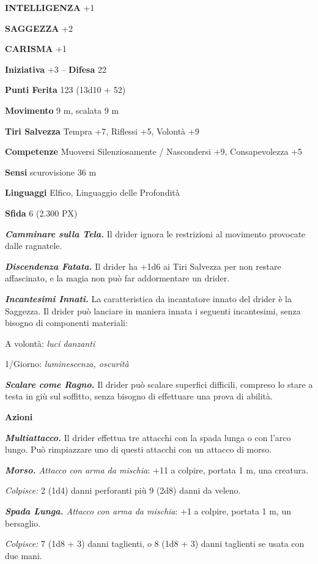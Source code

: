 \begin{multicols}{2}
\textbf{INTELLIGENZA} +1

\textbf{SAGGEZZA} +2

\textbf{CARISMA} +1

\textbf{Iniziativa} +3 -- \textbf{Difesa} 22

\textbf{Punti Ferita} 123 (13d10 + 52)

\textbf{Movimento} 9 m, scalata 9 m

\textbf{Tiri Salvezza} Tempra +7, Riflessi +5, Volontà +9

\textbf{Competenze} Muoversi Silenziosamente / Nascondersi +9, Consapevolezza +5

\textbf{Sensi} scurovisione 36 m

\textbf{Linguaggi} Elfico, Linguaggio delle Profondità

\textbf{Sfida} 6 (2.300 PX)

\textit{\textbf{Camminare sulla Tela.}} Il drider ignora le restrizioni al movimento provocate dalle ragnatele.

\textit{\textbf{Discendenza Fatata.}} Il drider ha +1d6 ai Tiri Salvezza per non restare affascinato, e la magia non può far addormentare un drider.

\textit{\textbf{Incantesimi Innati.}} La caratteristica da incantatore innato del drider è la Saggezza. Il drider può lanciare in maniera innata i seguenti incantesimi, senza bisogno di componenti materiali:

A volontà: \textit{luci danzanti}

1/Giorno: \textit{luminescenza, oscurità}

\textit{\textbf{Scalare come Ragno.}} Il drider può scalare superfici difficili, compreso lo stare a testa in giù sul soffitto, senza bisogno di effettuare una prova di abilità.

\textbf{Azioni}

\textit{\textbf{Multiattacco.}} Il drider effettua tre attacchi con la spada lunga o con l'arco lungo. Può rimpiazzare uno di questi attacchi con un attacco di morso.



\textit{\textbf{Morso.} Attacco con arma da mischia}: +11 a colpire, portata 1 m, una creatura.

\textit{Colpisce:} 2 (1d4) danni perforanti più 9 (2d8) danni da veleno.

\textit{\textbf{Spada Lunga.} Attacco con arma da mischia}: +1 a colpire, portata 1 m, un bersaglio.

\textit{Colpisce:} 7 (1d8 + 3) danni taglienti, o 8 (1d8 + 3) danni taglienti se usata con due mani.


\end{multicols}
